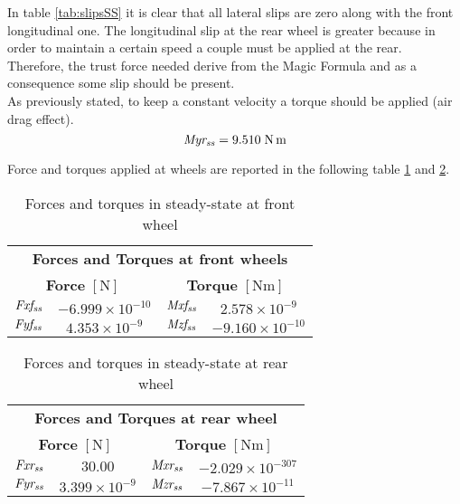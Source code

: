 In table \ref{tab:slipsSS} it is clear that all lateral slips are zero along with the front longitudinal one. The longitudinal slip at the rear wheel is greater because in order to maintain a certain speed a couple must be applied at the rear. Therefore, the trust force needed derive from the Magic Formula and as a consequence some slip should be present.\\
As previously stated, to keep a constant velocity a torque should be applied (air drag effect).
%
\begin{equation}
    { \it Myr_{ss}  }   = 9.510 \; \si{\newton\metre}                
\end{equation}
%

Force and torques applied at wheels are reported in the following table \ref{tab:FandTSSf} and \ref{tab:FandTSSr}.

\begin{table}[h!]
    \centering
    \begin{tabular}{@{}cccc@{}}
    \toprule
    \multicolumn{4}{c}{\textbf{Forces and Torques at front wheels}}                         \\
    \multicolumn{2}{c}{\textbf{Force} $[\si{\newton}]$} & \multicolumn{2}{c}{\textbf{Torque} $[\si{\newton\metre}]$}  \\ \midrule
    ${\it Fxf_{ss}}$ & $-6.999\times10^{-10}$ & ${ \it Mxf_{ss}}$ & $2.578\times10^{-9}  $\\
    ${\it Fyf_{ss}}$ & $4.353\times10^{-9}  $ & ${ \it Mzf_{ss}}$ & $-9.160\times10^{-10}$\\ 
    \bottomrule
    \end{tabular}
    \caption{Forces and torques in steady-state at front wheel}
    \label{tab:FandTSSf}
\end{table}

\begin{table}[h!]
    \centering
    \begin{tabular}{@{}cccc@{}}
    \toprule
    \multicolumn{4}{c}{\textbf{Forces and Torques at rear wheel}}                         \\
    \multicolumn{2}{c}{\textbf{Force} $[\si{\newton}]$} & \multicolumn{2}{c}{\textbf{Torque} $[\si{\newton\metre}]$} \\ \midrule
    ${\it Fxr_{ss}}$ & $30.00             $ & ${\it Mxr_{ss}}$ & $-2.029\times10^{-307}$\\
    ${\it Fyr_{ss}}$ & $3.399\times10^{-9}$ & ${\it Mzr_{ss}}$ & $-7.867\times10^{-11} $\\ 
    \bottomrule
    \end{tabular}
    \caption{Forces and torques in steady-state at rear wheel}
    \label{tab:FandTSSr}
\end{table}

